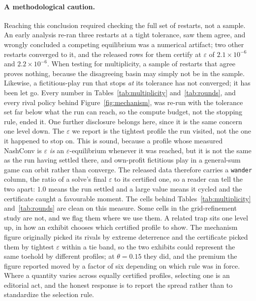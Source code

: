 \documentclass[11pt,a4paper]{article}
\newcommand{\theold}{\theta}   %
\begin{document}
\paragraph{A methodological caution.} Reaching this conclusion required checking the full set of restarts, not a sample. An early analysis re-ran three restarts at a tight tolerance, saw them agree, and wrongly concluded a competing equilibrium was a numerical artifact; two other restarts converged to it, and the released rows for them certify at $\varepsilon$ of $2.1\times10^{-6}$ and $2.2\times10^{-6}$. When testing for multiplicity, a sample of restarts that agree proves nothing, because the disagreeing basin may simply not be in the sample. Likewise, a fictitious-play run that stops \emph{at} its tolerance has not converged; it has been let go. Every number in Tables~\ref{tab:multiplicity} and~\ref{tab:rounds}, and every rival policy behind Figure~\ref{fig:mechanism}, was re-run with the tolerance set far below what the run can reach, so the compute budget, not the stopping rule, ended it. One further disclosure belongs here, since it is the same concern one level down. The $\varepsilon$ we report is the tightest profile the run visited, not the one it happened to stop on. This is sound, because a profile whose measured NashConv is $\varepsilon$ \emph{is} an $\varepsilon$-equilibrium whenever it was reached, but it is not the same as the run having settled there, and own-profit fictitious play in a general-sum game can orbit rather than converge. The released data therefore carries a \texttt{wander} column, the ratio of a solve's final $\varepsilon$ to its certified one, so a reader can tell the two apart: $1.0$ means the run settled and a large value means it cycled and the certificate caught a favourable moment. The cells behind Tables~\ref{tab:multiplicity} and~\ref{tab:rounds} are clean on this measure. Some cells in the grid-refinement study are not, and we flag them where we use them. A related trap sits one level up, in how an exhibit chooses which certified profile to show. The mechanism figure originally picked its rivals by extreme deterrence and the certificate picked them by tightest $\varepsilon$ within a tie band, so the two exhibits could represent the same toehold by different profiles; at $\theold=0.15$ they did, and the premium the figure reported moved by a factor of six depending on which rule was in force. Where a quantity varies across equally certified profiles, selecting one is an editorial act, and the honest response is to report the spread rather than to standardize the selection rule.
\end{document}
